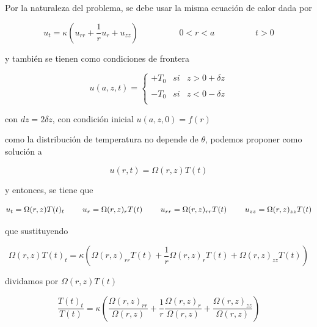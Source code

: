 \documentclass[12pt,a4paper]{article}
\begin{document}
\begin{enumerate}
    Por la naturaleza del problema, se debe usar la misma ecuación de calor dada por
    
    \begin{equation*}
        u_{t}= \kappa (u_{rr} + \frac{1}{r}u_r + u_{zz}) \hspace{2cm} 0 < r< a \hspace{2cm} t>0 
    \end{equation*}
    
    y también se tienen como condiciones de frontera 
    
    \begin{equation*}
        u(a,z,t)= \left\{ \begin{array}{lcc}
             +T_0 &   si  & z > 0 + \delta z\\
             \\ -T_0 &  si &z < 0 - \delta z\\
             \end{array}
        \right.
    \end{equation*}
    
    con $dz=2\delta z$, con condición inicial $u(a,z,0)=f(r)$
    
    como la distribución de temperatura no depende de $\theta$, podemos proponer como solución a
    
    \begin{equation*}
        u(r,t)= \Omega(r,z)T(t)
    \end{equation*}
    
    y entonces, se tiene que
    
    \begin{equation*}
        u_t= \Omega(r,z)T(t)_t \hspace{0.8cm} u_r=\Omega(r,z)_rT(t) \hspace{0.8cm} u_{rr} = \Omega(r,z)_{rr}T(t) \hspace{0.8cm} u_{zz}= \Omega(r,z)_{zz}T(t)
    \end{equation*}
    
    que sustituyendo
    
    \begin{equation*}
        \Omega(r,z)T(t)_t= \kappa (\Omega(r,z)_{rr}T(t) + \frac{1}{r}\Omega(r,z)_rT(t)+ \Omega(r,z)_{zz}T(t))
    \end{equation*}
    
    dividamos por $\Omega(r,z)T(t)$
    
    \begin{equation*}
        \frac{T(t)_t}{T(t)}= \kappa\left(\frac{\Omega(r,z)_{rr}}{\Omega(r,z)} + \frac{1}{r} \frac{\Omega(r,z)_r}{\Omega(r,z)} + \frac{\Omega(r,z)_{zz}}{\Omega(r,z)}\right)
    \end{equation*}
    

\end{enumerate}
\end{document}
